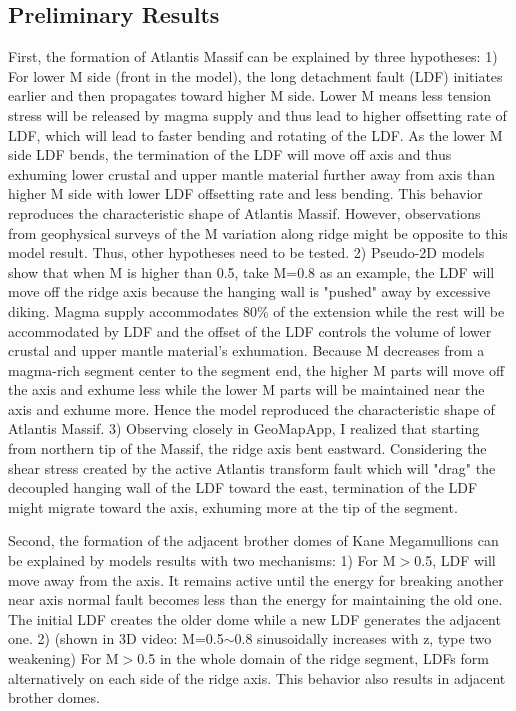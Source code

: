 \documentclass[12pt]{article}
\begin{document}
\subsection{Preliminary Results}

First, the formation of Atlantis Massif can be explained by three hypotheses: 
1) For lower M side (front in the model), the long detachment fault (LDF) initiates earlier and then propagates toward higher M side. Lower M means less tension stress will be released by magma supply and thus lead to higher offsetting rate of LDF, which will lead to faster bending and rotating of the LDF. As the lower M side LDF bends, the termination of the LDF will move off axis and thus exhuming lower crustal and upper mantle material further away from axis than higher M side with lower LDF offsetting rate and less bending. This behavior reproduces the characteristic shape of Atlantis Massif. However, observations from geophysical surveys of the M variation along ridge might be opposite to this model result. Thus, other hypotheses need to be tested.
2) Pseudo-2D models show that when M is higher than 0.5, take M=0.8 as an example, the LDF will move off the ridge axis because the hanging wall is "pushed" away by excessive diking. Magma supply accommodates 80\% of the extension while the rest will be accommodated by LDF and the offset of the LDF controls the volume of lower crustal and upper mantle material’s exhumation. Because M decreases from a magma-rich segment center to the segment end, the higher M parts will move off the axis and exhume less while the lower M parts will be maintained near the axis and exhume more. Hence the model reproduced the characteristic shape of Atlantis Massif. 
3) Observing closely in GeoMapApp, I realized that starting from northern tip of the Massif, the ridge axis bent eastward. Considering the shear stress created by the active Atlantis transform fault which will "drag" the decoupled hanging wall of the LDF toward the east, termination of the LDF might migrate toward the axis, exhuming more at the tip of the segment. 

Second, the formation of the adjacent brother domes of Kane Megamullions can be explained by models results with two mechanisms: 1) For M$>$0.5, LDF will move away from the axis. It remains active until the energy for breaking another near axis normal fault becomes less than the energy for maintaining the old one. The initial LDF creates the older dome while a new LDF generates the adjacent one. 2) (shown in 3D video:
M=0.5$\sim$0.8 sinusoidally increases with z, type two weakening) For M$>$0.5 in the whole domain of the ridge segment, LDFs form alternatively on each side of the ridge axis. This behavior also results in adjacent brother domes. 
\end{document}
